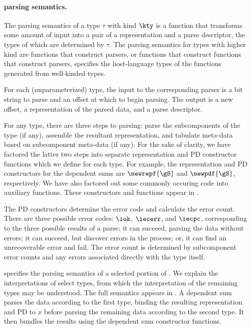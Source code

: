 \paragraph*{\ddc{} parsing semantics.}
\label{sec:parse-sem}
The parsing semantics of a type $\tau$ with kind $\kty$ is a function that
transforms some amount of input into a pair of a representation and a
parse descriptor, the types of which are determined by $\tau$.  The
parsing semantics for types with higher kind are functions that
construct parsers, or functions that construct functions that
construct parsers, \etc{}  specifies
the host-language types of the functions generated from well-kinded
\ddc{} types.

For each (unparameterized) type, the input to the corresponding parser
is a bit string to parse and an offset at which to begin parsing.  
The output is a new offset,
a representation of the parsed data, and a parse descriptor.

For any type, there are three steps to parsing: parse the
subcomponents of the type (if any), assemble the resultant
representation, and tabulate meta-data based on subcomponent meta-data
(if any). For the sake of clarity, we have factored the latter two
steps into separate representation and PD constructor functions which
we define for each type. 
For example, the
representation and PD constructors for the dependent sums are
$\newrepf {\gS}$ and $\newpdf {\gS}$, 
respectively.
We have also factored out some commonly
occuring code into auxiliary functions.  These constructors and functions
appear in .

The PD constructors determine the error code and calculate the error
count.  There are three possible error codes: $\iok$, $\iecerr$, and
$\iecpc$, corresponding to the three possible results of a parse: it
can succeed, parsing the data without errors; it can succeed, but
discover errors in the process; or, it can find an unrecoverable error
and fail.  The error count is determined by subcomponent error counts
and any errors associated directly with the type itself.

 specifies the parsing semantics of a
selected portion of \ddc{}. We explain the interpretations of select
types, from which the interpretation of the remaining types may be
understood. The full semantics appears in .
A dependent sum parses the data according to the first type, binding
the resulting representation and PD to $x$ before parsing the
remaining data according to the second type. It then bundles the
results using the dependent sum constructor functions.

